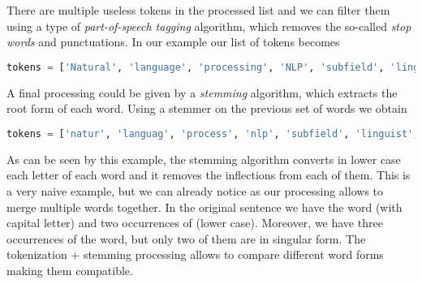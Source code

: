 \documentclass{standalone}
\begin{document}
There are multiple useless tokens in the processed list and we can filter them using a type of \emph{part-of-speech tagging} algorithm, which removes the so-called \emph{stop words} and punctuations.
In our example our list of tokens becomes

\lstset{style=snippet}
\begin{lstlisting}[language=Python, caption=Filtering stop-words and punctuations, label=code:filter]
tokens = ['Natural', 'language', 'processing', 'NLP', 'subfield', 'linguistics', 'computer', 'science', 'information', 'engineering', 'artificial', 'intelligence', 'concerned', 'interactions', 'computers','human', 'natural', 'languages', 'particular', 'program', 'computers', 'process', 'analyze', 'large', 'amounts', 'natural', 'language', 'data']
\end{lstlisting}

A final processing could be given by a \emph{stemming} algorithm, which extracts the root form of each word.
Using a stemmer on the previous set of words we obtain

\lstset{style=snippet}
\begin{lstlisting}[language=Python, caption=Stemming, label=code:stem]
tokens = ['natur', 'languag', 'process', 'nlp', 'subfield', 'linguist', 'comput', 'scienc', 'inform', 'engin', 'artifici', 'intellig', 'concern', 'interact', 'comput', 'human', 'natur', 'languag', 'particular', 'program', 'comput', 'process', 'analyz', 'larg', 'amount', 'natur', 'languag', 'data']
\end{lstlisting}

As can be seen by this example, the stemming algorithm converts in lower case each letter of each word and it removes the inflections from each of them.
This is a very naive example, but we can already notice as our processing allows to merge multiple words together.
In the original sentence we have the word  (with capital letter) and two occurrences of  (lower case).
Moreover, we have three occurrences of the  word, but only two of them are in singular form.
The \textsf{tokenization + stemming} processing allows to compare different word forms making them compatible.
\end{document}
